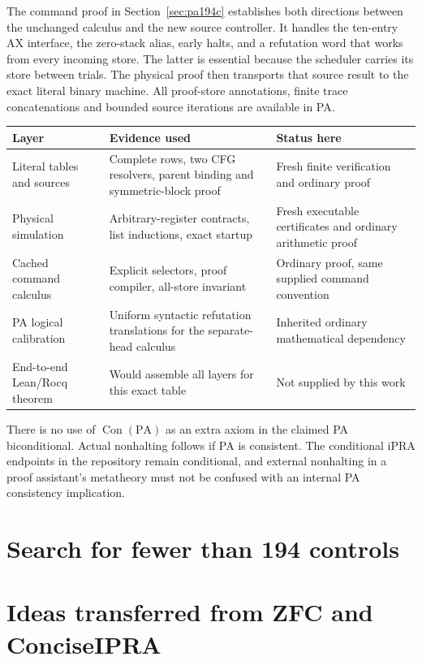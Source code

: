 \documentclass[11pt,letterpaper]{article}
\newcommand{\PA}{\mathrm{PA}}
\newcommand{\Con}{\operatorname{Con}}
\begin{document}
The command proof in Section~\ref{sec:pa194c} establishes both directions
between the unchanged calculus and the new source controller. It handles
the ten-entry AX interface, the zero-stack alias, early halts, and a
refutation word that works from every incoming store. The latter is
essential because the scheduler carries its store between trials.
The physical proof then transports that source result to the exact
literal binary machine. All proof-store annotations, finite trace
concatenations and bounded source iterations are available in PA.

\begin{center}\small
\begin{tabularx}{\linewidth}{@{}lXX@{}}
\toprule Layer & Evidence used & Status here\\
\midrule
Literal tables and sources & Complete rows, two CFG resolvers, parent binding and symmetric-block proof & Fresh finite verification and ordinary proof\\
Physical simulation & Arbitrary-register contracts, list inductions, exact startup & Fresh executable certificates and ordinary arithmetic proof\\
Cached command calculus & Explicit selectors, proof compiler, all-store invariant & Ordinary proof, same supplied command convention\\
PA logical calibration & Uniform syntactic refutation translations for the separate-head calculus & Inherited ordinary mathematical dependency\\
End-to-end Lean/Rocq theorem & Would assemble all layers for this exact table & Not supplied by this work\\
\bottomrule
\end{tabularx}
\end{center}
There is no use of $\Con(\PA)$ as an extra axiom in the claimed PA
biconditional. Actual nonhalting follows if PA is consistent. The
conditional iPRA endpoints in the repository remain conditional, and
external nonhalting in a proof assistant's metatheory must not be
confused with an internal PA consistency implication.

\section{Search for fewer than 194 controls}
\label{sec:search}


\section{Ideas transferred from ZFC and ConciseIPRA}
\end{document}
